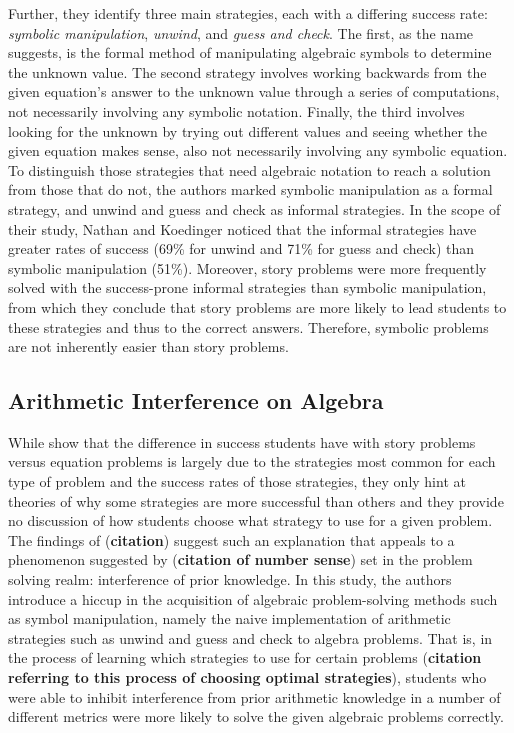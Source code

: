\documentclass[10pt,letterpaper]{article}
\begin{document}
Further, they identify three main strategies, each with a differing success rate: \textit{symbolic manipulation}, \textit{unwind}, and \textit{guess and check}. The first, as the name suggests, is the formal method of manipulating algebraic symbols to determine the unknown value. The second strategy involves working backwards from the given equation's answer to the unknown value through a series of computations, not necessarily involving any symbolic notation. Finally, the third involves looking for the unknown by trying out different values and seeing whether the given equation makes sense, also not necessarily involving any symbolic equation. To distinguish those strategies that need algebraic notation to reach a solution from those that do not, the authors marked symbolic manipulation as a formal strategy, and unwind and guess and check as informal strategies. In the scope of their study, Nathan and Koedinger noticed that the informal strategies have greater rates of success (69\% for unwind and 71\% for guess and check) than symbolic manipulation (51\%). Moreover, story problems were more frequently solved with the success-prone informal strategies than symbolic manipulation, from which they conclude that story problems are more likely to lead students to these strategies and thus to the correct answers. Therefore, symbolic problems are not inherently easier than story problems.

\subsection{Arithmetic Interference on Algebra}

While  show that the difference in success students have with story problems versus equation problems is largely due to the strategies most common for each type of problem and the success rates of those strategies, they only hint at theories of why some strategies are more successful than others and they provide no discussion of how students choose what strategy to use for a given problem. The findings of (\textbf{citation}) suggest such an explanation that appeals to a phenomenon suggested by (\textbf{citation of number sense}) set in the problem solving realm: interference of prior knowledge. In this study, the authors introduce a hiccup in the acquisition of algebraic problem-solving methods such as symbol manipulation, namely the naive implementation of arithmetic strategies such as unwind and guess and check to algebra problems. That is, in the process of learning which strategies to use for certain problems (\textbf{citation referring to this process of choosing optimal strategies}), students who were able to inhibit interference from prior arithmetic knowledge in a number of different metrics were more likely to solve the given algebraic problems correctly.
\end{document}
